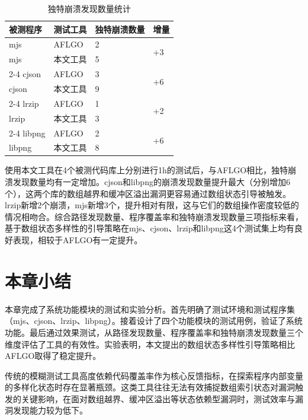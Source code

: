 \documentclass[bachelor]{njupthesis}
\begin{document}
\begin{table}[hbt]
\centering
\caption{独特崩溃发现数量统计}
\label{tab:crashes}
\begin{tabular}{llll}
\toprule
\textbf{被测程序} & \textbf{测试工具} & \textbf{独特崩溃数量} & \textbf{增量} \\
\midrule
mjs & AFLGO & 2 & \multirow{2}{*}{+3} \\
mjs & 本文工具 & 5 & \\
\cmidrule(lr){2-4}
cjson & AFLGO & 3 & \multirow{2}{*}{+6} \\
cjson & 本文工具 & 9 & \\
\cmidrule(lr){2-4}
lrzip & AFLGO & 1 & \multirow{2}{*}{+2} \\
lrzip & 本文工具 & 3 & \\
\cmidrule(lr){2-4}
libpng & AFLGO & 2 & \multirow{2}{*}{+6} \\
libpng & 本文工具 & 8 & \\
\bottomrule
\end{tabular}
\end{table}

使用本文工具在4个被测代码库上分别进行1h的测试后，与AFLGO相比，独特崩溃发现数量均有一定增加。cjson和libpng的崩溃发现数量提升最大（分别增加6个），这两个库的数组越界和缓冲区溢出漏洞更容易通过数组状态引导被触发。lrzip新增2个崩溃，mjs新增3个，提升相对有限，这与它们的数组操作密度较低的情况相吻合。综合路径发现数量、程序覆盖率和独特崩溃发现数量三项指标来看，基于数组状态多样性的引导策略在mjs、cjson、lrzip和libpng这4个测试集上均有良好表现，相较于AFLGO有一定提升。

\section{本章小结}

本章完成了系统功能模块的测试和实验分析。首先明确了测试环境和测试程序集（mjs、cjson、lrzip、libpng）。接着设计了四个功能模块的测试用例，验证了系统功能。最后通过效果测试，从路径发现数量、程序覆盖率和独特崩溃发现数量三个维度评估了工具的有效性。实验表明，本文提出的数组状态多样性引导策略相比AFLGO取得了稳定提升。


\thesisconclusion

传统的模糊测试工具高度依赖代码覆盖率作为核心反馈指标，在探索程序内部变量的多样化状态时存在显著瓶颈。这类工具往往无法有效捕捉数组索引状态对漏洞触发的关键影响，在面对数组越界、缓冲区溢出等状态依赖型漏洞时，测试效率与漏洞发现能力较为低下。
\end{document}
